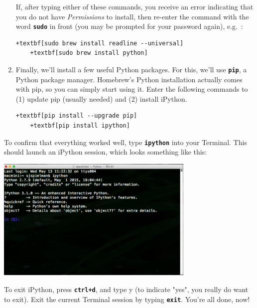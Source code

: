\documentclass{article}
\begin{document}
\begin{enumerate}
	If, after typing either of these commands, you receive an error indicating that you do not have \emph{Permissions} to install, then re-enter the command with the word \textbf{\texttt{sudo}} in front (you may be prompted for your password again), e.g.\ :
	\begin{Verbatim}[fontsize=\small,xleftmargin=-0.95cm,commandchars=+\[\]]
	+textbf[sudo brew install readline --universal]
	+textbf[sudo brew install python]
	\end{Verbatim}
	
	\item Finally, we'll install a few useful Python packages. For this, we'll use \textbf{\texttt{pip}}, a Python package manager. Homebrew's Python installation actually comes with pip, so you can simply start using it. Enter the following commands to (1) update pip (usually needed) and (2) install iPython.
	
	\begin{Verbatim}[fontsize=\small,xleftmargin=-0.95cm,commandchars=+\[\]]
	+textbf[pip install --upgrade pip]
	+textbf[pip install ipython]
	\end{Verbatim}

\end{enumerate}

\noindent To confirm that everything worked well, type \textbf{\texttt{ipython}} into your Terminal. This should launch an iPython session, which looks something like this:

\begin{center}
	\includegraphics[width=3.75in]{ipython_session.png}
\end{center}	


To exit iPython, press \textbf{\texttt{ctrl+d}}, and type y (to indicate "yes", you really do want to exit). Exit the current Terminal session by typing \textbf{\texttt{exit}}. You're all done, now!
\end{document}
